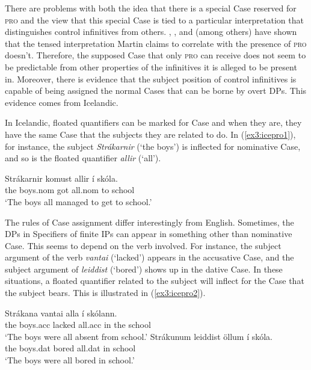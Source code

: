 There are problems with both the idea that there is a special Case reserved for \textsc{pro} and the view that this special Case is tied to a particular interpretation that distinguishes control infinitives from others. \citet{Pires:2001, Pires:2006}, \citet{Terzi:1992}, and \citet{Roussou:2001} (among others) have shown that the tensed interpretation Martin claims to correlate with the presence of \textsc{pro} doesn't. Therefore, the supposed Case that only \textsc{pro} can receive does not seem to be predictable from other properties of the infinitives it is alleged to be present in. Moreover, there is evidence that the subject position of control infinitives is capable of being assigned the normal Cases that can be borne by overt DPs. This evidence comes from Icelandic.

In Icelandic, floated quantifiers can be marked for Case and when they are, they have the same Case that the subjects they are related to do. In (\ref{ex3:icepro1}), for instance, the subject \emph{Str\'akarnir} (`the boys') is inflected for nominative Case, and so is the floated quantifier \emph{allir} (`all').
\begin{exe}
\ex \label{ex3:icepro1} \gll Str\'akarnir komust allir \'i sk\'ola. \\ {the boys.nom} got all.nom to school\\ `The boys all managed to get to school.'\\
\hspace*{\fill} \citep[(6a): 331]{Sigurdhsson:1991}\hspace*{.5in}
\end{exe}
The rules of Case assignment differ interestingly from English. Sometimes, the DPs in Specifiers of finite IPs can appear in something other than nominative Case. This seems to depend on the verb involved. For instance, the subject argument of the verb \emph{vanta{\dh}i} (`lacked') appears in the accusative Case, and the subject argument of \emph{leiddist} (`bored') shows up in the dative Case. In these situations, a floated quantifier related to the subject will inflect for the Case that the subject bears. This is illustrated in (\ref{ex3:icepro2}).
\begin{exe}
\ex \label{ex3:icepro2} 
\begin{xlist}
	\ex \gll Str\'akana vanta{\dh}i alla \'i sk\'olann. \\ {the boys.acc} lacked all.acc in {the school}\\ `The boys were all absent from school.'
	\ex \gll Str\'akunum leiddist \"ollum \'i sk\'ola. \\ {the boys.dat} bored all.dat in school\\ `The boys were all bored in school.'
\end{xlist}
\hspace*{\fill} \citep[(6b,c): 331]{Sigurdhsson:1991}\hspace*{.5in}
\end{exe}
